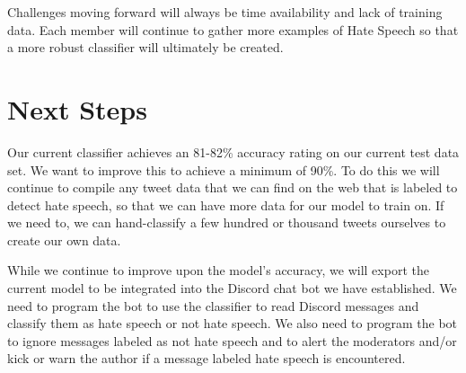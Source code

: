 \documentclass[conference]{sig-alternate-05-2015}
\begin{document}
Challenges moving forward will always be time availability and lack of training data.  Each member will continue to gather more examples of Hate Speech so that a more robust classifier will ultimately be created.  

\section{Next Steps}

Our current classifier achieves an 81-82\% accuracy rating on our current test data set. We want to improve this to achieve a minimum of 90\%. To do this we will continue to compile any tweet data that we can find on the web that is labeled to detect hate speech, so that we can have more data for our model to train on. If we need to, we can hand-classify a few hundred or thousand tweets ourselves to create our own data. 

While we continue to improve upon the model's accuracy, we will export the current model to be integrated into the Discord chat bot we have established. We need to program the bot to use the classifier to read Discord messages and classify them as hate speech or not hate speech. We also need to program the bot to ignore messages labeled as not hate speech and to alert the moderators and/or kick or warn the author if a message labeled hate speech is encountered.



\end{document}
